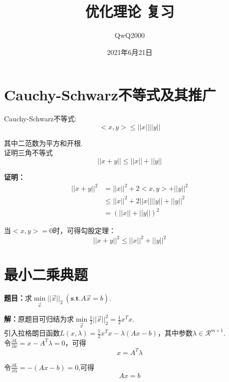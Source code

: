 \documentclass{article}
\title{优化理论 复习}
\author{QwQ2000}
\date{2021年6月21日}
\begin{document}
\maketitle
\noindent
\section{Cauchy-Schwarz不等式及其推广}
Cauchy-Schwarz不等式: 
\begin{equation*}
    <x,y>\leq||x|| ||y||
\end{equation*}

其中二范数为平方和开根.\\

证明三角不等式
\begin{equation*}
    ||x+y||\leq||x||+||y||
\end{equation*}

\textbf{证明：}
\begin{align*}
    ||x+y||^2&=||x||^2+2<x,y>+||y||^2\\
             &\leq ||x||^2+2||x|| ||y||+||y||^2\\
             &=(||x||+||y||)^2    
\end{align*}

当$<x,y>=0$时，可得勾股定理：
\begin{equation*}
    ||x+y||^2\leq ||x||^2+||y||^2
\end{equation*}

\section{最小二乘典题}
\textbf{题目：}求$\mathop{min}\limits_{\vec{x}}\vert\vert\vec{x}\vert\vert_2\ (\textbf{s.t.}A\vec{x}=b)$.

\textbf{解：}原题目可归结为求$\mathop{min}\limits_{\vec{x}}\frac{1}{2}\vert\vert\vec{x}\vert\vert_2^2 =\frac{1}{2}x^Tx$.\\

引入拉格朗日函数$L(x,\lambda)=\frac{1}{2}x^Tx-\lambda(Ax-b)$，其中参数$\lambda\in\mathcal{R}^{m\times 1}$.\\

令$\frac{\partial L}{\partial x}=x - A^T \lambda=0$，可得
\begin{equation*}
    x=A^T\lambda
\end{equation*}

令$\frac{\partial L}{\partial \lambda}=-(Ax-b)=0$,可得
\begin{equation*}
    Ax=b
\end{equation*}
\end{document}
